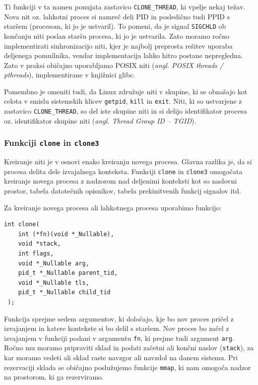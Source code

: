 \documentclass[a4paper,12pt,openright]{book}
\begin{document}
Ti funkciji v ta namen ponujata zastavico \texttt{CLONE\_THREAD}, ki vpelje nekaj težav.
Nova nit oz. lahkotni proces si namreč deli PID in posledično tudi PPID s staršem (procesom, ki jo je ustvaril).
To pomeni, da je signal \texttt{SIGCHLD} ob končanju niti poslan staršu procesa, ki jo je ustvarila.
Zato moramo ročno implementirati sinhronizacijo niti, kjer je najbolj preprosta rešitev uporaba deljenega pomnilnika, vendar implementacija lahko hitro postane nepregledna.
Zato v praksi običajno uporabljamo POSIX niti (\textit{angl. POSIX threads / pthreads}), implementirane v knjižnici glibc.

Pomembno je omeniti tudi, da Linux združuje niti v skupine, ki se obnašajo kot celota v smislu sistemskih klicev \texttt{getpid}, \texttt{kill} in \texttt{exit}.
Niti, ki so ustvarjene z zastavico \texttt{CLONE\_THREAD}, so del iste skupine niti in si delijo identifikator procesa oz. identifikator skupine niti (\textit{angl. Thread Group ID -- TGID}).

\subsubsection{Funkciji \texttt{clone} in \texttt{clone3}}

Kreiranje niti je v osnovi enako kreiranju novega procesa.
Glavna razlika je, da si procesa delita dele izvajalnega konteksta.
Funkciji \texttt{clone} in \texttt{clone3} omogočata kreiranje novega procesa z nadzorom nad deljenimi konteksti kot so naslovni prostor, tabela datotečnih opisnikov, tabela prekinitvenih funkcij signalov itd.

Za kreiranje novega procesa ali lahkotnega procesa uporabimo funkcijo:
\begin{lstlisting}[style=func]
 int clone(
	int (*fn)(void *_Nullable),
	void *stack,
	int flags,
	void *_Nullable arg,
	pid_t *_Nullable parent_tid,
	void *_Nullable tls,
	pid_t *_Nullable child_tid
 );
\end{lstlisting}

Funkcija sprejme sedem argumentov, ki določajo, kje bo nov proces pričel z izvajanjem in katere kontekste si bo delil s staršem.
Nov proces bo začel z izvajanjem v funkciji podani v argumentu \texttt{fn}, ki prejme tudi argument \texttt{arg}.
Ročno mu moramo pripraviti sklad in podati začetni ali končni naslov (\texttt{stack}), za kar moramo vedeti ali sklad raste navzgor ali navzdol na danem sistemu.
Pri rezervaciji sklada se običajno poslužujemo funkcije \texttt{mmap}, ki nam omogoča nadzor na prostorom, ki ga rezerviramo.
\end{document}
